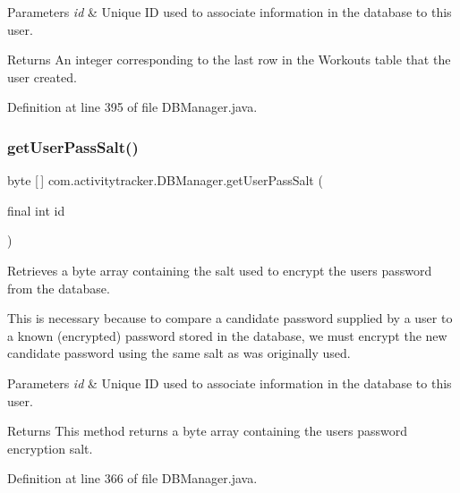 \begin{DoxyParams}{Parameters}
{\em id} & Unique ID used to associate information in the database to this user. \\
\hline
\end{DoxyParams}
\begin{DoxyReturn}{Returns}
An integer corresponding to the last row in the Workouts table that the user created. 
\end{DoxyReturn}


Definition at line 395 of file D\+B\+Manager.\+java.

\mbox{\label{classcom_1_1activitytracker_1_1_d_b_manager_aeab864b072cc08c0521e80ae1f459ca7}} 
\subsubsection{\texorpdfstring{get\+User\+Pass\+Salt()}{getUserPassSalt()}}
{\footnotesize\ttfamily byte \mbox{[}$\,$\mbox{]} com.\+activitytracker.\+D\+B\+Manager.\+get\+User\+Pass\+Salt (\begin{DoxyParamCaption}\item[{final int}]{id }\end{DoxyParamCaption})}

Retrieves a byte array containing the salt used to encrypt the user\textquotesingle{}s password from the database.

This is necessary because to compare a candidate password supplied by a user to a known (encrypted) password stored in the database, we must encrypt the new candidate password using the same salt as was originally used.


\begin{DoxyParams}{Parameters}
{\em id} & Unique ID used to associate information in the database to this user.\\
\hline
\end{DoxyParams}
\begin{DoxyReturn}{Returns}
This method returns a byte array containing the user\textquotesingle{}s password encryption salt. 
\end{DoxyReturn}


Definition at line 366 of file D\+B\+Manager.\+java.

